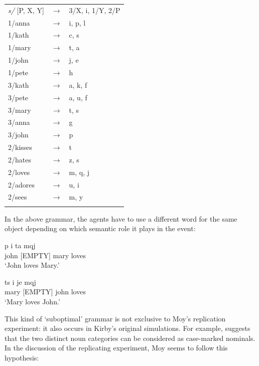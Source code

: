 \ea
\label{g:moy-grammar}
\begin{tabular}{l c l}
{\em s/} [P, X, Y] & $\rightarrow$  & 3/X, i, 1/Y, 2/P
\\ 1/anna & $\rightarrow$ & i, p, l
\\ 1/kath & $\rightarrow$ & c, s
\\ 1/mary & $\rightarrow$ & t, a
\\ 1/john & $\rightarrow$ & j, e
\\ 1/pete & $\rightarrow$ & h
\\ 3/kath & $\rightarrow$ & a, k, f
\\ 3/pete & $\rightarrow$ & a, u, f
\\ 3/mary & $\rightarrow$ & t, s
\\ 3/anna & $\rightarrow$ & g
\\ 3/john & $\rightarrow$ & p
\\ 2/kisses & $\rightarrow$ & t
\\ 2/hates & $\rightarrow$ & z, s
\\ 2/loves & $\rightarrow$ & m, q, j
\\ 2/adores&  $\rightarrow$ & u, i
\\ 2/sees & $\rightarrow$ & m, y
\\ \citep[p. 113]{moy06case}
\end{tabular}
\z

In the above grammar, the agents have to use a different word for the same object depending on which semantic role it plays in the event:

\ea
\gll p i ta mqj \\
john {[EMPTY]} mary loves \\
\glt `John loves Mary.' \\

\item
\gll ts i je mqj \\
mary {[EMPTY]} john loves \\
\glt `Mary loves John.' \\
\z

This kind of `suboptimal' grammar is not exclusive to Moy's replication experiment: it also occurs in Kirby's original simulations. For example, \citet{kirby99syntax} suggests that the two distinct noun categories can be considered as case-marked nominals. In the discussion of the replicating experiment, Moy seems to follow this hypothesis:

